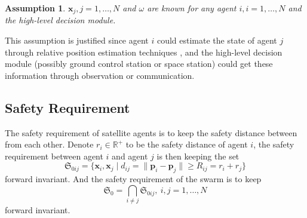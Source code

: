 \documentclass{ifacconf}
\newtheorem{assumption}[asmp]{Assumption}
\begin{document}
\begin{assumption}
$\boldsymbol{x}_j, j = 1, \dots, N$ and $\omega$ are known for any agent $i, i = 1, \dots, N$ and the high-level decision module.
\end{assumption}
\par This assumption is justified since agent $i$ could estimate the state of agent $j$ through relative position estimation techniques \cite[]{XXX}, and the high-level decision module (possibly ground control station or space station) could get these information through observation \cite[]{XXX} or communication.

\subsection{Safety Requirement}
\par The safety requirement of satellite agents is to keep the safety distance between from each other. 
Denote $r_i \in \mathbb{R}^+$ to be the safety distance of agent $i$, the safety requirement between agent $i$ and agent $j$ is then keeping the set
\begin{equation}
   \mathfrak{S}_{0ij} = \{\boldsymbol{x}_i, \boldsymbol{x}_j \mid d_{ij} = \| \boldsymbol{p}_i - \boldsymbol{p}_j \| \ge R_{ij} = r_i + r_j \}
\end{equation}
forward invariant. 
And the safety requirement of the swarm is to keep 
\begin{equation}
   \mathfrak{S}_0 = \bigcap_{i \neq j}\mathfrak{S}_{0ij}, ~i,j = 1, \dots, N
\end{equation}
forward invariant.
\end{document}
